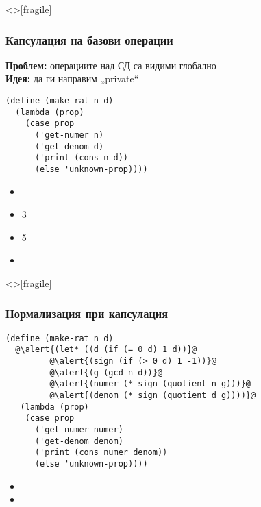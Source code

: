 \documentclass[alsotrans,beameroptions={aspectratio=169}]{beamerswitch}
\begin{document}
\begin{frame}<>[fragile]
  \frametitle{Капсулация на базови операции}

  \textbf{Проблем:} операциите над СД са видими глобално\\[2ex]
  \pause
  \textbf{Идея:} да ги направим „private“
  \pause
\begin{lstlisting}
(define (make-rat n d)
  (lambda (prop)
    (case prop
      ('get-numer n)
      ('get-denom d)
      ('print (cons n d))
      (else 'unknown-prop))))
\end{lstlisting}
  \pause
  \begin{itemize}
  \item {}
  \item {}3
  \item {}5
  \item {}
  \end{itemize}
\end{frame}

\begin{frame}<>[fragile]
  \frametitle{Нормализация при капсулация}

\sizeboth\small
\begin{lstlisting}
(define (make-rat n d)
  @\alert{(let* ((d (if (= 0 d) 1 d))}@
         @\alert{(sign (if (> 0 d) 1 -1))}@
         @\alert{(g (gcd n d))}@
         @\alert{(numer (* sign (quotient n g)))}@
         @\alert{(denom (* sign (quotient d g))))}@
   (lambda (prop)
    (case prop
      ('get-numer numer)
      ('get-denom denom)
      ('print (cons numer denom))
      (else 'unknown-prop))))
\end{lstlisting}
  \pause
  \begin{itemize}
  \item {}
  \item {}
  \end{itemize}
\end{frame}
\end{document}
